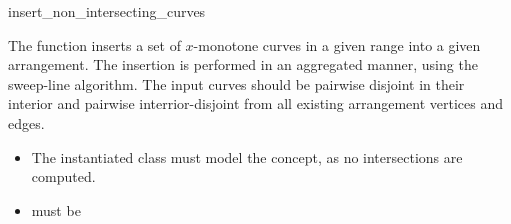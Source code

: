 \ccRefPageBegin

\begin{ccRefFunction}{insert_non_intersecting_curves}

\ccDefinition

The function \ccRefName{} inserts a set of $x$-monotone curves in a given
range into a given arrangement. The insertion is performed in an aggregated
manner, using the sweep-line algorithm. The input curves should be pairwise
disjoint in their interior and pairwise interrior-disjoint from all existing
arrangement vertices and edges. 



\ccRequirements
\begin{itemize}
\item The instantiated  class must model the
   concept, as no intersections are computed.
\item {} must be 
\end{itemize}

\end{ccRefFunction}

\ccRefPageEnd
